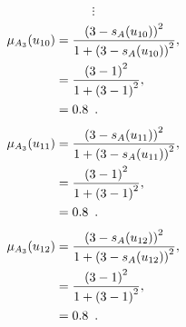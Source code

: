 \documentclass[a4paper,openany]{book}
\begin{document}
				\[
					\vdots
				\]
				\begin{align}
					\mu_{A_3}(u_{10}) &= \frac{\left(3-s_A(u_{10})\right)^2}{1 + \left(3-s_A(u_{10})\right)^2} ,\\
					&= \frac{\left(3-1\right)^2}{1 + \left(3-1\right)^2} \notag ,\\
					&= 0.8 \enspace. \notag
				\end{align}				
				\begin{align}
					\mu_{A_3}(u_{11}) &= \frac{\left(3-s_A(u_{11})\right)^2}{1 + \left(3-s_A(u_{11})\right)^2} ,\\
					&= \frac{\left(3-1\right)^2}{1 + \left(3-1\right)^2} \notag ,\\
					&= 0.8 \enspace. \notag
				\end{align}
				\begin{align}
					\mu_{A_3}(u_{12}) &= \frac{\left(3-s_A(u_{12})\right)^2}{1 + \left(3-s_A(u_{12})\right)^2} ,\\
					&= \frac{\left(3-1\right)^2}{1 + \left(3-1\right)^2} \notag ,\\
					&= 0.8 \enspace. \notag
				\end{align}
\end{document}
